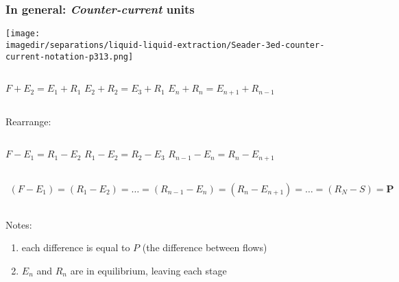 \begin{frame}\frametitle{In general: \emph{Counter-current} units}
	\begin{center}
		\texttt{[image: \\imagedir/separations/liquid-liquid-extraction/Seader-3ed-counter-current-notation-p313.png]}
	\end{center}
		\begin{center}
			\begin{columns}[t]
					\small $F + E_2 = E_1 + R_1$
					\small $E_2 + R_2 = E_3 + R_1$
					\small $E_n + R_n = E_{n+1} + R_{n-1}$
			\end{columns}
		\end{center}
		\vspace{-12pt}
		Rearrange:
		\begin{center}		
			\begin{columns}[t]
					\small $F - E_1 = R_1 - E_2$
					\small $R_1 - E_2 = R_2 - E_3$
					\small $R_{n-1} - E_n = R_{n} - E_{n+1}$
			\end{columns}
		\end{center}
		\vspace{-12pt}
		\begin{columns}[t]
				{			
				\small
				\[	
				\begin{array}{c}
					(F - E_1)  =  (R_1 - E_2) = \ldots = (R_{n-1} - E_n) = (R_{n} - E_{n+1}) = \ldots = (R_N - S) = \mathbf{P}
				\end{array}		
				\]}
		\end{columns}
		Notes:
		\begin{enumerate}
			\item	each difference is equal to $P$ (the difference between flows)
			\item	$E_n$ and $R_{n}$ are in equilibrium, leaving each stage {\color{myOrange}{[via tie line]}}
		\end{enumerate} 
\end{frame}

